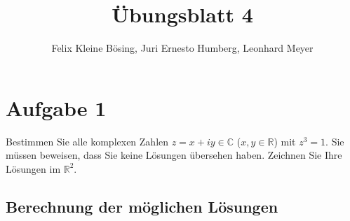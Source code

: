 \documentclass[11pt]{article}
\begin{document}
\title{Übungsblatt 4}
\author{Felix Kleine Bösing, Juri Ernesto Humberg, Leonhard Meyer}
\maketitle

\section*{Aufgabe 1}

Bestimmen Sie alle komplexen Zahlen \( z = x + iy \in \mathbb{C} \) (\( x, y \in \mathbb{R} \)) mit \( z^3 = 1 \). Sie müssen beweisen, dass Sie keine Lösungen übersehen haben. Zeichnen Sie Ihre Lösungen im \( \mathbb{R}^2 \).

\subsection*{Berechnung der möglichen Lösungen}
\end{document}
